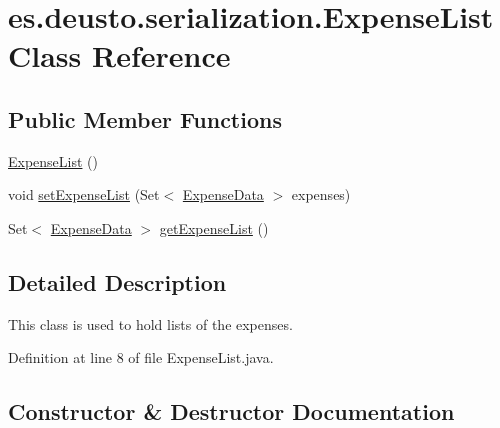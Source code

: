 \hypertarget{classes_1_1deusto_1_1serialization_1_1_expense_list}{}\section{es.\+deusto.\+serialization.\+Expense\+List Class Reference}
\label{classes_1_1deusto_1_1serialization_1_1_expense_list}
\subsection*{Public Member Functions}
\begin{DoxyCompactItemize}
\item 
\hyperlink{classes_1_1deusto_1_1serialization_1_1_expense_list_a899ae4c57bec201fe7fe90615c8b4c93}{Expense\+List} ()
\item 
void \hyperlink{classes_1_1deusto_1_1serialization_1_1_expense_list_a0ab9d9c259b8a4bcb1a1891f8ea85520}{set\+Expense\+List} (Set$<$ \hyperlink{classes_1_1deusto_1_1serialization_1_1_expense_data}{Expense\+Data} $>$ expenses)
\item 
Set$<$ \hyperlink{classes_1_1deusto_1_1serialization_1_1_expense_data}{Expense\+Data} $>$ \hyperlink{classes_1_1deusto_1_1serialization_1_1_expense_list_aa54bbdc7fde1b0c4f6be8e5af053f4c4}{get\+Expense\+List} ()
\end{DoxyCompactItemize}


\subsection{Detailed Description}
This class is used to hold lists of the expenses. 

Definition at line 8 of file Expense\+List.\+java.



\subsection{Constructor \& Destructor Documentation}
\mbox{\label{classes_1_1deusto_1_1serialization_1_1_expense_list_a899ae4c57bec201fe7fe90615c8b4c93}} 
